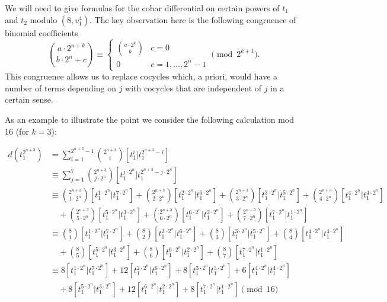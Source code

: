 We will need to give formulas for the cobar differential on certain powers of $t_1$ and $t_2$ modulo $(8,v_1^4)$. The key observation here is the following congruence of binomial coefficients
\[ \binom{a \cdot 2^{n+k}}{b \cdot 2^{n} + c} \equiv \begin{cases} \binom{a \cdot 2^k}{b} & c=0 \\ 0 & c=1,\dots,2^n-1 \end{cases} \pmod{2^{k+1}}. \]
This congruence allows us to replace cocycles which, a priori, would have a number of terms depending on $j$ with cocycles that are independent of $j$ in a certain sense. 

\begin{exm} \label{exm:t1powermod16}
As an example to illustrate the point we consider the following calculation mod 16 (for $k=3$):

\begingroup
\allowdisplaybreaks
\begin{align*}
  d(t_1^{2^{n+3}}) &= \sum_{i=1}^{2^{n+3} -1} \binom{2^{n+3}}{i} [t_1^i | t_1^{2^{n+3} - i}] \\
  &\equiv \sum_{j=1}^{7} \binom{2^{n+3}}{j \cdot 2^n} [t_1^{j \cdot 2^n} | t_1^{2^{n+3} - j \cdot 2^n}] \\
  &\equiv \binom{2^{n+3}}{1 \cdot 2^n} [t_1^{1 \cdot 2^{n}} | t_1^{7 \cdot 2^{n}}] + \binom{2^{n+3}}{2 \cdot 2^n} [t_1^{2 \cdot 2^{n}} | t_1^{6 \cdot 2^{n}}] + \binom{2^{n+3}}{3\cdot 2^n} [t_1^{3 \cdot 2^{n}} | t_1^{5 \cdot 2^{n}}] + \binom{2^{n+3}}{4\cdot 2^n} [t_1^{4 \cdot 2^{n}} | t_1^{4 \cdot 2^{n}}] \\
  &\quad + \binom{2^{n+3}}{5\cdot 2^n} [t_1^{5 \cdot 2^{n}} | t_1^{3 \cdot 2^{n}}] + \binom{2^{n+3}}{6\cdot 2^n} [t_1^{6 \cdot 2^{n}} | t_1^{2 \cdot 2^{n}}] + \binom{2^{n+3}}{7\cdot 2^n} [t_1^{7 \cdot 2^{n}} | t_1^{1 \cdot 2^{n}}]  \\
                   &\equiv \binom{8}{1} [t_1^{1 \cdot 2^{n}} | t_1^{7 \cdot 2^{n}}] + \binom{8}{2} [t_1^{2 \cdot 2^{n}} | t_1^{6 \cdot 2^{n}}] + \binom{8}{3} [t_1^{3 \cdot 2^{n}} | t_1^{5 \cdot 2^{n}}] + \binom{8}{4} [t_1^{4 \cdot 2^{n}} | t_1^{4 \cdot 2^{n}}] \\
                   &\quad + \binom{8}{5} [t_1^{5 \cdot 2^{n}} | t_1^{3 \cdot 2^{n}}] + \binom{8}{6} [t_1^{6 \cdot 2^{n}} | t_1^{2 \cdot 2^{n}}] + \binom{8}{7} [t_1^{7 \cdot 2^{n}} | t_1^{1 \cdot 2^{n}}]  \\
                 &\equiv 8[t_1^{1 \cdot 2^{n}} | t_1^{7 \cdot 2^{n}}] + 12[t_1^{2 \cdot 2^{n}} | t_1^{6 \cdot 2^{n}}] + 8[t_1^{3 \cdot 2^{n}} | t_1^{5 \cdot 2^{n}}] + 6 [t_1^{4 \cdot 2^{n}} | t_1^{4 \cdot 2^{n}}] \\
                 &\quad + 8 [t_1^{5 \cdot 2^{n}} | t_1^{3 \cdot 2^{n}}] + 12 [t_1^{6 \cdot 2^{n}} | t_1^{2 \cdot 2^{n}}] + 8 [t_1^{7 \cdot 2^{n}} | t_1^{1 \cdot 2^{n}}]  \pmod{16}
\end{align*}


\end{exm}
